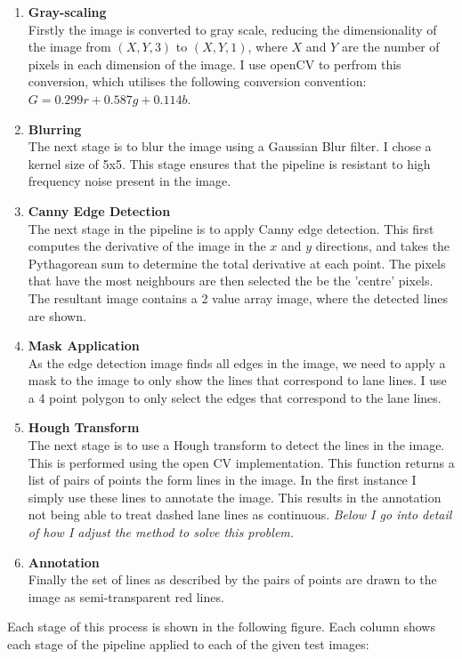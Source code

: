 \documentclass[letterpaper,12pt]{article}
\begin{document}
\begin{enumerate}
\item \textbf{Gray-scaling}\\
Firstly the image is converted to gray scale, reducing the dimensionality of the image from $(X,Y,3)$ to $(X,Y,1)$, where $X$ and $Y$ are the number of pixels in each dimension of the image. I use openCV to perfrom this conversion, which utilises the following conversion convention: $G= 0.299r + 0.587g + 0.114b$.
\item \textbf{Blurring}\\
The next stage is to blur the image using a Gaussian Blur filter. I chose a kernel size of 5x5. This stage ensures that the pipeline is resistant to high frequency noise present in the image.
\item \textbf{Canny Edge Detection}\\
The next stage in the pipeline is to apply Canny edge detection. This first computes the derivative of the image in the $x$ and $y$ directions, and takes the Pythagorean sum to determine the total derivative at each point. The pixels that have the most neighbours are then selected the be the 'centre' pixels. The resultant image contains a 2 value array image, where the detected lines are shown.
\item \textbf{Mask Application}\\
As the edge detection image finds all edges in the image, we need to apply a mask to the image to only show the lines that correspond to lane lines. I use a 4 point polygon to only select the edges that correspond to the lane lines.
\item \textbf{Hough Transform}\\
The next stage is to use a Hough transform to detect the lines in the image. This is performed using the open CV implementation. This function returns a list of pairs of points the form lines in the image. In the first instance I simply use these lines to annotate the image. This results in the annotation not being able to treat dashed lane lines as continuous. \textit{Below I go into detail of how I adjust the method to solve this problem.}
\item \textbf{Annotation}\\
Finally the set of lines as described by the pairs of points are drawn to the image as semi-transparent red lines. 

\end{enumerate}
Each stage of this process is shown in the following figure. Each column shows each stage of the pipeline applied to each of the given test images:
\end{document}
